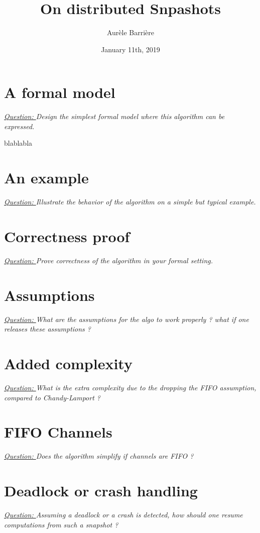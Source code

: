 \documentclass{article}
\title{On distributed Snpashots}
\author{Aur\`ele Barri\`ere}
\date{January 11th, 2019}
\begin{document}
\maketitle

\def\q#1{\textit{\underline{Question: }#1}}

\section{A formal model}
\q{Design the simplest formal model where this algorithm can be expressed.}

blablabla

\section{An example}
\q{Illustrate the behavior of the algorithm on a simple but typical example.}

\section{Correctness proof}
\q{Prove correctness of the algorithm in your formal setting.}

\section{Assumptions}
\q{What are the assumptions for the algo to work properly ? what if one releases these assumptions ?}

\section{Added complexity}
\q{What is the extra complexity due to the dropping the FIFO assumption, compared to Chandy-Lamport ?}

\section{FIFO Channels}
\q{Does the algorithm simplify if channels are FIFO ?}

\section{Deadlock or crash handling}
\q{Assuming a deadlock or a crash is detected, how should one resume computations from such a snapshot ?}
\end{document}
